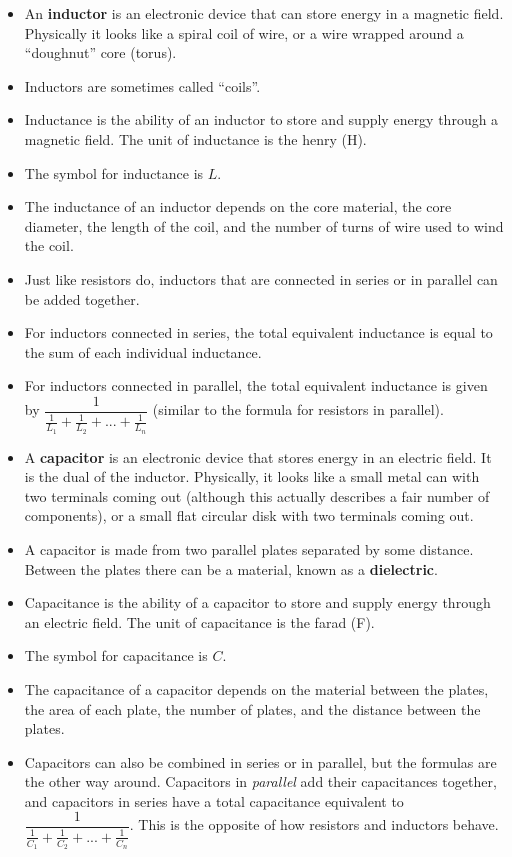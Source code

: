 \documentclass[letterpaper,12pt]{scrartcl}
\begin{document}
\begin{itemize}
\item An \textbf{inductor} is an electronic device that can store energy in a magnetic field. Physically it looks like a spiral coil of wire, or a wire wrapped around a ``doughnut'' core (torus).
\item Inductors are sometimes called ``coils''.
\item Inductance is the ability of an inductor to store and supply energy through a magnetic field. The unit of inductance is the henry (H).
\item The symbol for inductance is $L$.
\item The inductance of an inductor depends on the core material, the core diameter, the length of the coil, and the number of turns of wire used to wind the coil.
\item Just like resistors do, inductors that are connected in series or in parallel can be added together.
\item For inductors connected in series, the total equivalent inductance is equal to the sum of each individual inductance.
\item For inductors connected in parallel, the total equivalent inductance is given by $\dfrac{1}{\frac{1}{L_1} + \frac{1}{L_2} + ... + \frac{1}{L_n}}$
(similar to the formula for resistors in parallel).
\item A \textbf{capacitor} is an electronic device that stores energy in an electric field. It is the dual of the inductor. Physically, it looks like a small metal can with two terminals coming out
(although this actually describes a fair number of components), or a small flat circular disk with two terminals coming out.
\item A capacitor is made from two parallel plates separated by some distance. Between the plates there can be a material, known as a \textbf{dielectric}.
\item Capacitance is the ability of a capacitor to store and supply energy through an electric field. The unit of capacitance is the farad (F).
\item The symbol for capacitance is $C$.
\item The capacitance of a capacitor depends on the material between the plates, the area of each plate, the number of plates, and the distance between the plates.
\item Capacitors can also be combined in series or in parallel, but the formulas are the other way around. Capacitors in \textit{parallel} add their capacitances together,
and capacitors in series have a total capacitance equivalent to $\dfrac{1}{\frac{1}{C_1} + \frac{1}{C_2} + ... + \frac{1}{C_n}}$. This is the opposite of how resistors and inductors behave.
\end{itemize}
\end{document}
